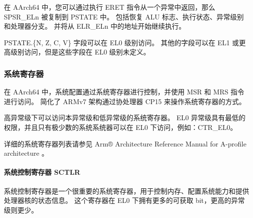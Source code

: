 在 AArch64 中，您可以通过执行 ERET 指令从一个异常中返回，那么 SPSR\_ELn 被复制到 PSTATE 中。
包括恢复 ALU 标志、执行状态、异常级别和处理器分支。
并将从 ELR\_ELn 中的地址开始继续执行。

PSTATE.\{N, Z, C, V\} 字段可以在 EL0 级别访问。
其他的字段可以在 EL1 或更高级别访问，但是这些字段在 EL0 级别未定义。

\subsubsection{系统寄存器}

在 AArch64 中，系统配置通过系统寄存器进行控制，并使用 MSR 和 MRS 指令进行访问。
简化了 ARMv7 架构通过协处理器 CP15 来操作系统寄存器的方式。

高异常级下可以访问本异常级和低异常级的系统寄存器。
EL0 异常级具有最低的权限，并且只有极少数的系统系统器可以在 EL0 下访问，例如：CTR\_EL0。

详细的系统寄存器列表请参见 Arm® Architecture Reference Manual for A-profile architecture \cite{armrefman}。

\paragraph*{系统控制寄存器 SCTLR}

系统控制寄存器是一个很重要的系统寄存器，用于控制内存、配置系统能力和提供处理器核的状态信息。
这个寄存器在 EL0 下拥有更多的可获取 bit，更高的异常级则更少。


